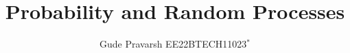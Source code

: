 \documentclass[journal,12pt,twocolumn]{IEEEtran}
\DeclareMathOperator*{\Res}{Res}
\begin{document}
\newtheorem{theorem}{Theorem}[section]
\newtheorem{problem}{Problem}
\newtheorem{proposition}{Proposition}[section]
\newtheorem{lemma}{Lemma}[section]
\newtheorem{corollary}[theorem]{Corollary}
\newtheorem{example}{Example}[section]
\newtheorem{definition}[problem]{Definition}
\newcommand{\BEQA}{\begin{eqnarray}}
\newcommand{\EEQA}{\end{eqnarray}}
\newcommand{\define}{\stackrel{\triangle}{=}}

\providecommand{\mbf}{\mathbf}
\providecommand{\pr}[1]{\ensuremath{\Pr\left(#1\right)}}
\providecommand{\qfunc}[1]{\ensuremath{Q\left(#1\right)}}
\providecommand{\sbrak}[1]{\ensuremath{{}\left[#1\right]}}
\providecommand{\lsbrak}[1]{\ensuremath{{}\left[#1\right.}}
\providecommand{\rsbrak}[1]{\ensuremath{{}\left.#1\right]}}
\providecommand{\brak}[1]{\ensuremath{\left(#1\right)}}
\providecommand{\lbrak}[1]{\ensuremath{\left(#1\right.}}
\providecommand{\rbrak}[1]{\ensuremath{\left.#1\right)}}
\providecommand{\cbrak}[1]{\ensuremath{\left\{#1\right\}}}
\providecommand{\lcbrak}[1]{\ensuremath{\left\{#1\right.}}
\providecommand{\rcbrak}[1]{\ensuremath{\left.#1\right\}}}
\theoremstyle{remark}
\newtheorem{rem}{Remark}
\newcommand{\sgn}{\mathop{\mathrm{sgn}}}
\providecommand{\abs}[1]{\left\vert#1\right\vert}
\providecommand{\res}[1]{\Res\displaylimits_{#1}} 
\providecommand{\norm}[1]{\left\lVert#1\right\rVert}
\providecommand{\mtx}[1]{\mathbf{#1}}
\providecommand{\mean}[1]{E\left[ #1 \right]}
\providecommand{\fourier}{\overset{\mathcal{F}}{ \rightleftharpoons}}
\providecommand{\system}[1]{\overset{\mathcal{#1}}{ \longleftrightarrow}}
\newcommand{\solution}{\noindent \textbf{Solution: }}
\newcommand{\cosec}{\,\text{cosec}\,}
\providecommand{\dec}[2]{\ensuremath{\overset{#1}{\underset{#2}{\gtrless}}}}
\newcommand{\myvec}[1]{\ensuremath{\begin{pmatrix}#1\end{pmatrix}}}
\newcommand{\mydet}[1]{\ensuremath{\begin{vmatrix}#1\end{vmatrix}}}
\let\vec\mathbf
\def\putbox#1#2#3{\makebox[0in][l]{\makebox[#1][l]{}\raisebox{\baselineskip}[0in][0in]{\raisebox{#2}[0in][0in]{#3}}}}
     \def\rightbox#1{\makebox[0in][r]{#1}}
     \def\centbox#1{\makebox[0in]{#1}}
     \def\topbox#1{\raisebox{-\baselineskip}[0in][0in]{#1}}
     \def\midbox#1{\raisebox{-0.5\baselineskip}[0in][0in]{#1}}
\setlength{\parindent}{0pt}



\title{
Probability and Random Processes
}
\author{ Gude Pravarsh EE22BTECH11023$^{*}$%
}
	
\end{document}
